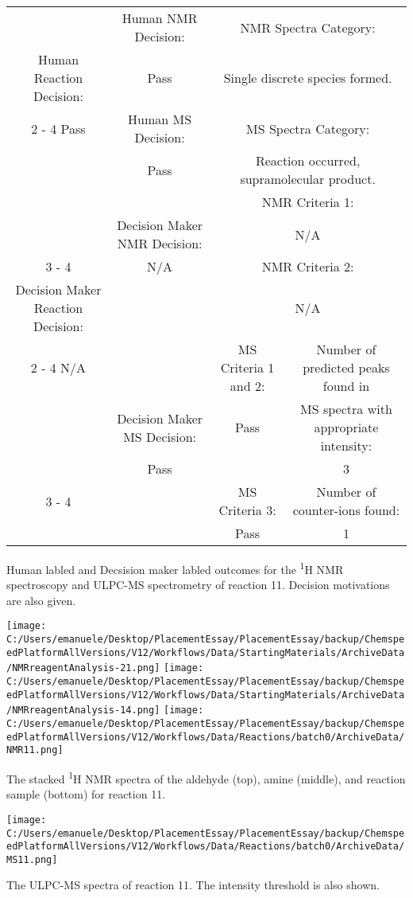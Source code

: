 \documentclass{article}%
\begin{document}
\begin{Decision Table}[H]%
\begin{tabular}{|c|c|c|c|}%
\hline%
&Human NMR Decision:&\multicolumn{2}{|c|}{NMR Spectra Category:}\\%
Human Reaction Decision:&Pass&\multicolumn{2}{|c|}{Single discrete species formed.}\\%
\cline{2%
-%
4}%
Pass&Human MS Decision:&\multicolumn{2}{|c|}{MS Spectra Category:}\\%
&Pass&\multicolumn{2}{|c|}{Reaction occurred, supramolecular product.}\\%
\hline%
&&\multicolumn{2}{|c|}{NMR Criteria 1:}\\%
&Decision Maker NMR Decision:&\multicolumn{2}{|c|}{N/A}\\%
\cline{3%
-%
4}%
&N/A&\multicolumn{2}{|c|}{NMR Criteria 2:}\\%
Decision Maker Reaction Decision:&&\multicolumn{2}{|c|}{N/A}\\%
\cline{2%
-%
4}%
N/A&&MS Criteria 1 and 2:&Number of predicted peaks found in\\%
&Decision Maker MS Decision:&Pass&MS spectra with appropriate intensity:\\%
&Pass&&3\\%
\cline{3%
-%
4}%
&&MS Criteria 3:&Number of counter{-}ions found:\\%
&&Pass&1\\%
\hline%
\end{tabular}%
\caption{Human labled and Decsision maker labled outcomes for the \textsuperscript{1}H NMR spectroscopy and ULPC-MS spectrometry of reaction 11. Decision motivations are also given.}%
\end{Decision Table}%
\begin{NMR Spectra}[H]%
\begin{center}%
\texttt{[image: C:/Users/emanuele/Desktop/PlacementEssay/PlacementEssay/backup/ChemspeedPlatformAllVersions/V12/Workflows/Data/StartingMaterials/ArchiveData/NMRreagentAnalysis-21.png]}\hfill%
\texttt{[image: C:/Users/emanuele/Desktop/PlacementEssay/PlacementEssay/backup/ChemspeedPlatformAllVersions/V12/Workflows/Data/StartingMaterials/ArchiveData/NMRreagentAnalysis-14.png]}\hfill%
\texttt{[image: C:/Users/emanuele/Desktop/PlacementEssay/PlacementEssay/backup/ChemspeedPlatformAllVersions/V12/Workflows/Data/Reactions/batch0/ArchiveData/NMR11.png]}\hfill%
\end{center}%
\caption{The stacked \textsuperscript{1}H NMR spectra of the aldehyde (top), amine (middle), and reaction sample (bottom) for reaction 11.}%
\end{NMR Spectra}%
\begin{MS Spectra}[H]%
\begin{center}%
\texttt{[image: C:/Users/emanuele/Desktop/PlacementEssay/PlacementEssay/backup/ChemspeedPlatformAllVersions/V12/Workflows/Data/Reactions/batch0/ArchiveData/MS11.png]}\hfill%
\end{center}%
\caption{The ULPC-MS spectra of reaction 11. The intensity threshold is also shown.}%
\end{MS Spectra}%
\end{document}
